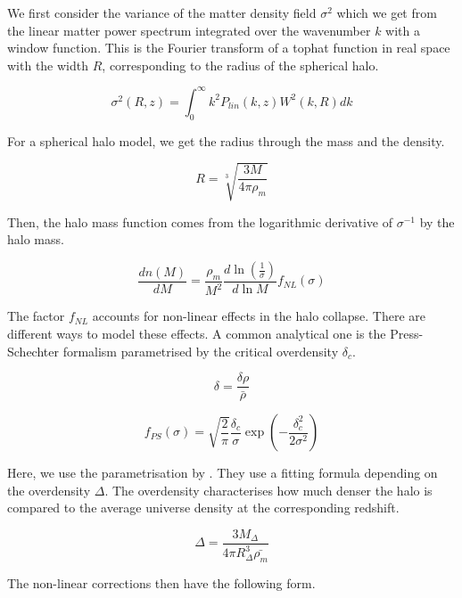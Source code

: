 We first consider the variance of the matter density field $\sigma^2$ which we get from the linear matter power spectrum integrated over the wavenumber $k$ with a window function. This is the Fourier transform of a tophat function in real space with the width $R$, corresponding to the radius of the spherical halo.

\begin{equation}
    \sigma^2(R, z) = \int_0^\infty k^2 P_{lin}(k, z) W^2(k, R) dk
\end{equation}

For a spherical halo model, we get the radius through the mass and the density.

\begin{equation}
    R= \sqrt[3]{\frac{3M}{4\pi \rho_m}}
\end{equation}

Then, the halo mass function comes from the logarithmic derivative of $\sigma^{-1}$ by the halo mass.

\begin{equation}
    \frac{dn(M)}{dM }=\frac{\rho_m}{M^2}\frac{d\ln (\frac{1}{\sigma})}{d\ln M}f_{NL}(\sigma)
\end{equation}

The factor $f_{NL}$ accounts for non-linear effects in the halo collapse. There are different ways to model these effects. A common analytical one is the Press-Schechter formalism parametrised by the critical overdensity $\delta_c$.

\begin{equation}
    \delta = \frac{\delta \rho}{\bar{\rho}}
\end{equation}

\begin{equation}
    f_{PS}(\sigma)=\sqrt{\frac{2}{\pi}} \frac{\delta_c}{\sigma}\exp(-\frac{\delta_c^2}{2\sigma^2})
\end{equation}

Here, we use the parametrisation by \cite{tinker_toward_2008}. They use a fitting formula depending on the overdensity $\Delta$. The overdensity characterises how much denser the halo is compared to the average universe density at the corresponding redshift.

\begin{equation}
    \Delta = \frac{3M_{\Delta}}{4\pi R^3_{\Delta}\bar{\rho_m}}
\end{equation}

The non-linear corrections then have the following form.

